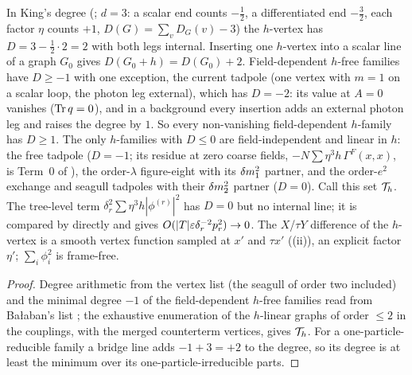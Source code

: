 \begin{lemma}\label{rot:lem:S1}
In King's degree (\cite[(3.30)--(3.31)]{K1}; $d=3$: a scalar end counts $-\frac12$, a differentiated end $-\frac32$, each factor $\eta$ counts $+1$, $D(G)=\sum_vD_G(v)-3$) the $h$-vertex \cite[(3.21)]{K1} has $D=3-\frac12\cdot2=2$ with both legs internal. Inserting one $h$-vertex into a scalar line of a graph $G_0$ gives $D(G_0+h)=D(G_0)+2$. Field-dependent $h$-free families have $D\ge-1$ with one exception, the current tadpole (one vertex \cite[(3.22)]{K1} with $m=1$ on a scalar loop, the photon leg external), which has $D=-2$: its value at $A=0$ vanishes ($\operatorname{Tr} q=0$), and in a background every insertion adds an external photon leg and raises the degree by $1$. So every non-vanishing field-dependent $h$-family has $D\ge1$. The only $h$-families with $D\le0$ are field-independent and linear in $h$: the free tadpole ($D=-1$; its residue at zero coarse fields, $-N\sum\eta^3h\,\Gamma^F(x,x)$, is Term~0 of ), the order-$\lambda$ figure-eight with its $\delta m^2_1$ partner, and the order-$e^2$ exchange and seagull tadpoles with their $\delta m^2_2$ partner ($D=0$). Call this set $\mathcal T_h$. The tree-level term $\delta_r^2\sum\eta^3h|\phi^{(r)}|^2$ has $D=0$ but no internal line; it is compared by  directly and gives $O(|T|\varepsilon\delta_r^{-2}p_r^2)\to0$. The $X$/$\tau Y$ difference of the $h$-vertex is a smooth vertex function sampled at $x'$ and $\tau x'$ ((ii)), an explicit factor $\eta'$; $\sum_i\phi_i^2$ is frame-free.
\end{lemma}
\begin{proof}
Degree arithmetic from the vertex list \cite[(3.18)--(3.26)]{K1} (the seagull of order two included) and the minimal degree $-1$ of the field-dependent $h$-free families read from Ba{\l}aban's list \cite[(2.4)]{Ba3}; the exhaustive enumeration of the $h$-linear graphs of order $\le2$ in the couplings, with the merged counterterm vertices, gives $\mathcal T_h$. For a one-particle-reducible family a bridge line adds $-1+3=+2$ to the degree, so its degree is at least the minimum over its one-particle-irreducible parts.
\end{proof}

